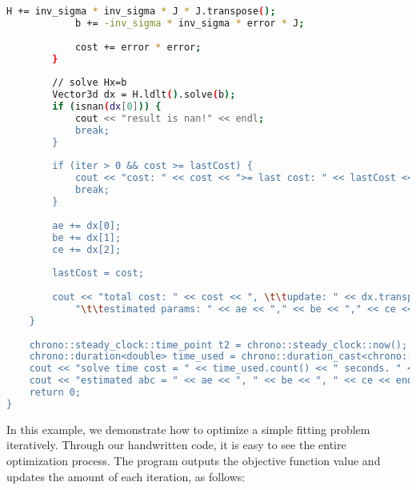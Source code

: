 \begin{lstlisting}[language=sh,caption=slambook2/ch6/gaussNewton.cpp]
            H += inv_sigma * inv_sigma * J * J.transpose();
            b += -inv_sigma * inv_sigma * error * J;
            
            cost += error * error;
        }
        
        // solve Hx=b
        Vector3d dx = H.ldlt().solve(b);
        if (isnan(dx[0])) {
            cout << "result is nan!" << endl;
            break;
        }
        
        if (iter > 0 && cost >= lastCost) {
            cout << "cost: " << cost << ">= last cost: " << lastCost << ", break." << endl;
            break;
        }
        
        ae += dx[0];
        be += dx[1];
        ce += dx[2];
        
        lastCost = cost;
        
        cout << "total cost: " << cost << ", \t\tupdate: " << dx.transpose() <<
            "\t\testimated params: " << ae << "," << be << "," << ce << endl;
    }
    
    chrono::steady_clock::time_point t2 = chrono::steady_clock::now();
    chrono::duration<double> time_used = chrono::duration_cast<chrono::duration<double>>(t2 - t1);
    cout << "solve time cost = " << time_used.count() << " seconds. " << endl;
    cout << "estimated abc = " << ae << ", " << be << ", " << ce << endl;
    return 0;
}
\end{lstlisting}
In this example, we demonstrate how to optimize a simple fitting problem iteratively. Through our handwritten code, it is easy to see the entire optimization process. The program outputs the objective function value and updates the amount of each iteration, as follows:

